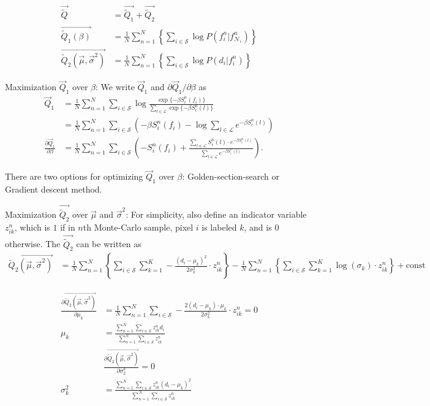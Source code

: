\documentclass{article}
\begin{document}
\begin{align*}
  \vec {\widetilde Q} &= \vec {\widetilde Q_1} + \vec {\widetilde Q_2} \\
  \vec {\widetilde Q_1 (\beta)} &= \frac{1}{N}\sum_{n=1}^N \left \{ \sum_{i \in \mathcal{S}} \log P(f_i^n | f^n_{\mathcal{N}_i})\right \} \\
  \vec {\widetilde Q_2(\vec \mu, \vec \sigma^2)} &= \frac{1}{N}\sum_{n=1}^N \left \{  \sum_{i \in \mathcal{S}} \log P(d_i | f_i^n) \right \}
\end{align*}


Maximization $\vec Q_1$ over $\beta$: We write $\vec Q_1$ and $\partial \vec Q_1 / \partial \beta$ as 
\begin{align*}
  \vec Q_1 &= \frac{1}{N}\sum_{n = 1}^{N} \sum_{i \in \mathcal{S}}^{} \log \frac{\exp \{ -\beta S_i^n(f_i)\}}{\sum_{l \in \mathcal{L}} \exp \{ -\beta S_i^n(l) \}} \\
  &= \frac{1}{N}\sum_{n = 1}^{N} \sum_{i \in \mathcal{S}}^{} \left (-\beta S_i^n(f_i) - \log \sum_{l \in \mathcal{L}} e^{ -\beta S_i^n(l)} \right) \\
  \frac{\partial \vec Q_1}{\partial \beta} &= \frac{1}{N}\sum_{n = 1}^{N} \sum_{i \in \mathcal{S}}^{} \left ( -S_i^n(f_i) + \frac{\sum_{l \in \mathcal{L}} S_i^n(l) \cdot e^{ -\beta S_i^n(l)}}{\sum_{l \in \mathcal{L}} e^{ -\beta S_i^n(l)}} \right ).
\end{align*}

There are two options for optimizing $\vec Q_1$ over $\beta$: Golden-section-search or Gradient descent method. 


Maximization  $\vec {\widetilde Q_2}$ over $\vec \mu$ and $\vec \sigma^2$: 
For simplicity, also define an indicator variable $z_{ik}^n$, which is $1$ if in $n$th Monte-Carlo sample, pixel $i$ is labeled $k$, and is $0$ otherwise. The $\vec {\widetilde Q_2}$ can be written as
\begin{align*}
  \vec {\widetilde Q_2(\vec \mu, \vec \sigma^2)} &= \frac{1}{N}\sum_{n=1}^N \left \{  \sum_{i \in \mathcal{S}} \sum_{k = 1}^{K} -\frac{(d_i - \mu_k)^2}{2\sigma_k^2} \cdot z_{ik}^n\right \} - \frac{1}{N}\sum_{n=1}^N \left \{  \sum_{i \in \mathcal{S}} \sum_{k = 1}^{K} \log(\sigma_k) \cdot z_{ik}^n \right \} + \mathrm{const}
\end{align*}

\begin{align*}
  \frac{\partial  \vec {\widetilde Q_2(\vec \mu, \vec \sigma^2)}}{\partial \mu_k} &= \frac{1}{N}\sum_{n=1}^N  \sum_{i \in \mathcal{S}} -\frac{2(d_i- \mu_k) \cdot \mu_k}{2\sigma_k^2} \cdot z_{ik}^n = 0\\
  \mu_k &= \frac{\sum_{n=1}^N  \sum_{i \in \mathcal{S}} z_{ik}^n d_i}{\sum_{n=1}^N  \sum_{i \in \mathcal{S}}  z_{ik}^n}\\
  &\frac{\partial  \vec {\widetilde Q_2(\vec \mu, \vec \sigma^2)}}{\partial \sigma_2^k} = 0 \\
  \sigma_k^2 &= \frac{\sum_{n=1}^N  \sum_{i \in \mathcal{S}} z_{ik}^n (d_i - \mu_k)^2}{\sum_{n=1}^N  \sum_{i \in \mathcal{S}}  z_{ik}^n}\\
\end{align*}
\end{document}

